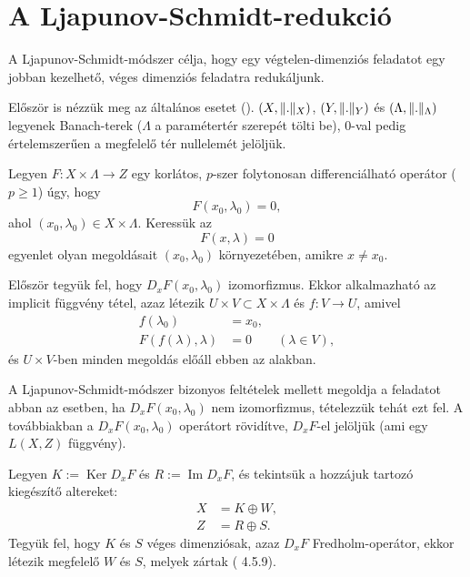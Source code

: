 \documentclass[oneside, titlepage, 12pt, a4paper]{report}
\DeclareMathOperator{\Ima}{Im}	%
\DeclareMathOperator{\Ker}{Ker}	%
\DeclarePairedDelimiter\norm{\lVert}{\rVert}	%
\begin{document}
\section{A Ljapunov-Schmidt-redukció}
\label{sec:LSMethod}
A Ljapunov-Schmidt-módszer célja, hogy egy végtelen-dimenziós feladatot egy jobban kezelhető, véges dimenziós feladatra redukáljunk. \par
Először is nézzük meg az általános esetet (\cite{8.6TLSM, chapter2chapter10}). $(X, \norm{.}_X)$, $(Y, \norm{.}_Y)$ és $(\Lambda, \norm{.}_\Lambda)$ legyenek Banach-terek ($\Lambda$ a paramétertér szerepét tölti be), 0-val pedig értelemszerűen a megfelelő tér nullelemét jelöljük.\par
Legyen $F : X \times \Lambda \rightarrow Z$ egy korlátos, $p$-szer folytonosan differenciálható operátor ($p \ge 1$) úgy, hogy
\begin{equation*}
F(x_0, \lambda_0) = 0,
\end{equation*}
ahol $(x_0, \lambda_0) \in X \times \Lambda$. Keressük az 
\begin{equation}
\label{eq:LSproblem}
F(x, \lambda) = 0
\end{equation}
egyenlet olyan megoldásait $(x_0, \lambda_0)$ környezetében, amikre $x \ne x_0$. \par
Először tegyük fel, hogy $D_xF(x_0, \lambda_0)$ izomorfizmus. Ekkor alkalmazható az implicit függvény tétel, azaz létezik $ U \times V \subset X \times \Lambda$ és $f : V \rightarrow U$, amivel
\begin{align*}
f(\lambda_0) &= x_0, \\
F(f(\lambda), \lambda) &= 0 \qquad(\lambda \in V),
\end{align*}
és $U \times V$-ben minden megoldás előáll ebben az alakban. \par
A Ljapunov-Schmidt-módszer bizonyos feltételek mellett megoldja a feladatot abban az esetben, ha $D_xF(x_0, \lambda_0)$ nem izomorfizmus, tételezzük tehát ezt fel. A továbbiakban a $D_xF(x_0, \lambda_0)$ operátort rövidítve, $D_xF$-el jelöljük (ami egy $L(X, Z)$ függvény). \par
Legyen $K := \Ker D_xF$ és $R := \Ima D_xF$, és tekintsük a hozzájuk tartozó kiegészítő altereket:
\begin{align*}
X &= K \oplus W, \\
Z &= R \oplus S.
\end{align*}
Tegyük fel, hogy $K$ és $S$ véges dimenziósak, azaz $D_xF$ Fredholm-operátor, ekkor létezik megfelelő $W$ és $S$, melyek zártak (\cite{funkanal} 4.5.9).	%
\end{document}
